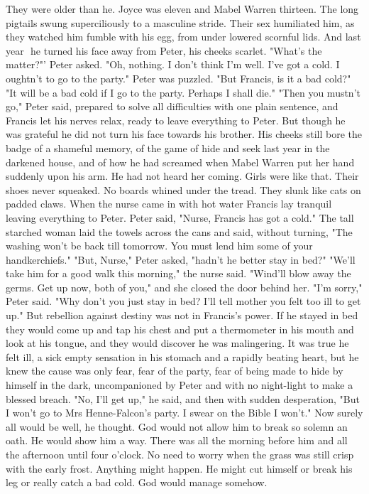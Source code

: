 \documentclass{report}
\begin{document}
They were older than he. Joyce was eleven and Mabel Warren thirteen. The long
pigtails swung superciliously to a masculine stride. Their sex humiliated him,
as they watched him fumble with his egg, from under lowered scornful lids. And
last year  he turned his face away from Peter, his cheeks scarlet.
"What's the matter?"' Peter asked.
"Oh, nothing. I don't think I'm well. I've got a cold. I oughtn't to go to the
party."
Peter was puzzled. "But Francis, is it a bad cold?"
"It will be a bad cold if I go to the party. Perhaps I shall die."
"Then you mustn't go," Peter said, prepared to solve all difficulties with one
plain sentence, and Francis let his nerves relax, ready to leave everything to
Peter. But though he was grateful he did not turn his face towards his brother.
His cheeks still bore the badge of a shameful memory, of the game of hide and
seek last year in the darkened house, and of how he had screamed when Mabel
Warren put her hand suddenly upon his arm. He had not heard her coming. Girls
were like that. Their shoes never squeaked. No boards whined under the tread.
They slunk like cats on padded claws.
When the nurse came in with hot water Francis lay tranquil leaving everything to
Peter. Peter said, "Nurse, Francis has got a cold."
The tall starched woman laid the towels across the cans and said, without
turning, "The washing won't be back till tomorrow. You must lend him some of
your handkerchiefs."
"But, Nurse," Peter asked, "hadn't he better stay in bed?"
"We'll take him for a good walk this morning," the nurse said. "Wind'll blow
away the germs. Get up now, both of you," and she closed the door behind her.
"I'm sorry," Peter said. "Why don't you just stay in bed? I'll tell mother you
felt too ill to get up." But rebellion against destiny was not in Francis's
power. If he stayed in bed they would come up and tap his chest and put a
thermometer in his mouth and look at his tongue, and they would discover he was
malingering. It was true he felt ill, a sick empty sensation in his stomach and
a rapidly beating heart, but he knew the cause was only fear, fear of the party,
fear of being made to hide by himself in the dark, uncompanioned by Peter and
with no night-light to make a blessed breach.
"No, I'll get up," he said, and then with sudden desperation, "But I won't go to
Mrs Henne-Falcon's party. I swear on the Bible I won't." Now surely all would be
well, he thought. God would not allow him to break so solemn an oath. He would
show him a way. There was all the morning before him and all the afternoon until
four o'clock. No need to worry when the grass was still crisp with the early
frost. Anything might happen. He might cut himself or break his leg or really
catch a bad cold. God would manage somehow.
\end{document}
